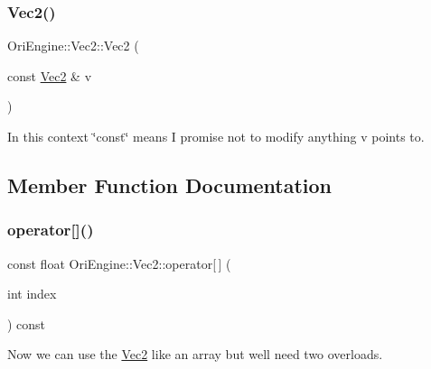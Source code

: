 \hypertarget{struct_ori_engine_1_1_vec2_a8769147a1ce655442d97dbeb504151a7}{}\label{struct_ori_engine_1_1_vec2_a8769147a1ce655442d97dbeb504151a7} 
\subsubsection{\texorpdfstring{Vec2()}{Vec2()}\hspace{0.1cm}{\footnotesize\ttfamily [3/3]}}
{\footnotesize\ttfamily Ori\+Engine\+::\+Vec2\+::\+Vec2 (\begin{DoxyParamCaption}\item[{const \hyperlink{struct_ori_engine_1_1_vec2}{Vec2} \&}]{v }\end{DoxyParamCaption})\hspace{0.3cm}{\ttfamily [inline]}}



In this context \char`\"{}const\char`\"{} means I promise not to modify anything v points to. 



\subsection{Member Function Documentation}
\hypertarget{struct_ori_engine_1_1_vec2_a481efce1521eb8c44802275f56030ea5}{}\label{struct_ori_engine_1_1_vec2_a481efce1521eb8c44802275f56030ea5} 
\subsubsection{\texorpdfstring{operator[]()}{operator[]()}\hspace{0.1cm}{\footnotesize\ttfamily [1/2]}}
{\footnotesize\ttfamily const float Ori\+Engine\+::\+Vec2\+::operator\mbox{[}$\,$\mbox{]} (\begin{DoxyParamCaption}\item[{int}]{index }\end{DoxyParamCaption}) const\hspace{0.3cm}{\ttfamily [inline]}}



Now we can use the \hyperlink{struct_ori_engine_1_1_vec2}{Vec2} like an array but we\textquotesingle{}ll need two overloads. 


